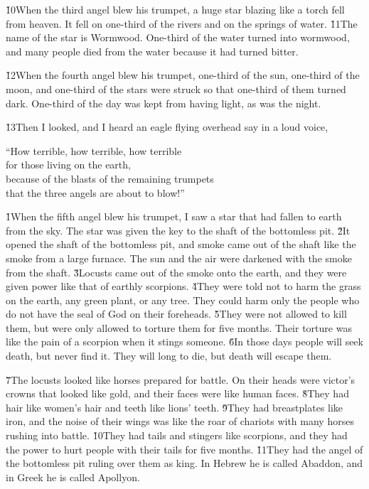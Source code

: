 \v{10}When the third angel blew his trumpet, a huge star blazing like a torch fell from heaven. It fell on one-third of the rivers and on the springs of water. \v{11}The name of the star is Wormwood. One-third of the water turned into wormwood, and many people died from the water because it had turned bitter.

\v{12}When the fourth angel blew his trumpet, one-third of the sun, one-third of the moon, and one-third of the stars were struck so that one-third of them turned dark. One-third of the day was kept from having light, as was the night.

\v{13}Then I looked, and I heard an eagle flying overhead say in a loud voice,

\begin{poetry}
\poeml ``How terrible, how terrible, how terrible \\
\poemll    for those living on the earth, \\
\poeml because of the blasts of the remaining trumpets \\
\poemll    that the three angels are about to blow!''
\end{poetry}

\v{1}When the fifth angel blew his trumpet, I saw a star that had fallen to earth from the sky. The star was given the key to the shaft of the bottomless pit. \v{2}It opened the shaft of the bottomless pit, and smoke came out of the shaft like the smoke from a large furnace. The sun and the air were darkened with the smoke from the shaft. \v{3}Locusts came out of the smoke onto the earth, and they were given power like that of earthly scorpions. \v{4}They were told not to harm the grass on the earth, any green plant, or any tree. They could harm only the people who do not have the seal of God on their foreheads. \v{5}They were not allowed to kill them, but were only allowed to torture them for five months. Their torture was like the pain of a scorpion when it stings someone. \v{6}In those days people will seek death, but never find it. They will long to die, but death will escape them.

\v{7}The locusts looked like horses prepared for battle. On their heads were victor's crowns that looked like gold, and their faces were like human faces. \v{8}They had hair like women's hair and teeth like lions' teeth. \v{9}They had breastplates like iron, and the noise of their wings was like the roar of chariots with many horses rushing into battle. \v{10}They had tails and stingers like scorpions, and they had the power to hurt people with their tails for five months. \v{11}They had the angel of the bottomless pit ruling over them as king. In Hebrew he is called Abaddon, and in Greek he is called Apollyon.

